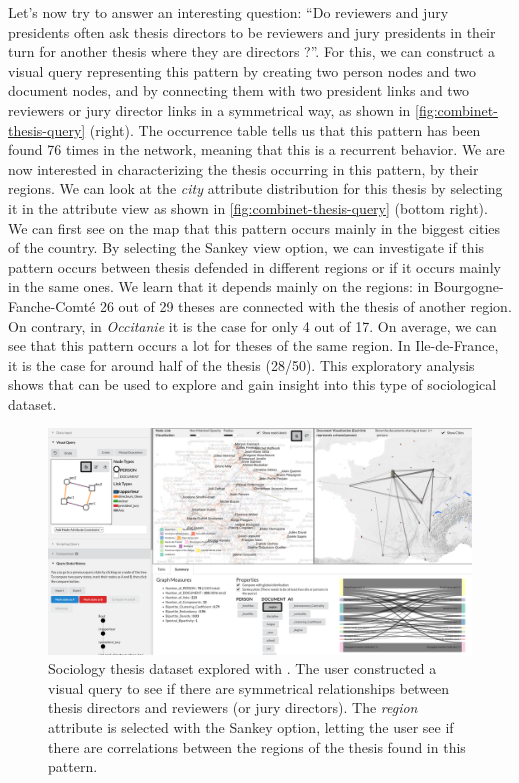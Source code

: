 Let's now try to answer an interesting question: ``Do reviewers and jury presidents often ask thesis directors to be reviewers and jury presidents in their turn for another thesis where they are directors ?''.
For this, we can construct a visual query representing this pattern by creating two person nodes and two document nodes, and by connecting them with two president links and two reviewers or jury director links in a symmetrical way, as shown in \autoref{fig:combinet-thesis-query} (right).
The occurrence table tells us that this pattern has been found 76 times in the network, meaning that this is a recurrent behavior.
We are now interested in characterizing the thesis occurring in this pattern, by their regions.
We can look at the \textit{city} attribute distribution for this thesis by selecting it in the attribute view as shown in \autoref{fig:combinet-thesis-query} (bottom right).
We can first see on the map that this pattern occurs mainly in the biggest cities of the country.
By selecting the Sankey view option, we can investigate if this pattern occurs between thesis defended in different regions or if it occurs mainly in the same ones.
We learn that it depends mainly on the regions: in Bourgogne-Fanche-Comté 26 out of 29 theses are connected with the thesis of another region.
On contrary, in \textit{Occitanie} it is the case for only 4 out of 17.
On average, we can see that this pattern occurs a lot for theses of the same region.
In Ile-de-France, it is the case for around half of the thesis (28/50).
This exploratory analysis shows that \name can be used to explore and gain insight into this type of sociological dataset.

\begin{figure}[!ht]
    \centering
    \includegraphics[width=1\textwidth]{static/figures/ComBiNet/Thesis-query01-and-results}
    \caption{Sociology thesis dataset explored with \name. The user constructed a visual query to see if there are symmetrical relationships between thesis directors and reviewers (or jury directors). The \textit{region} attribute is selected with the Sankey option, letting the user see if there are correlations between the regions of the thesis found in this pattern.  }\label{fig:combinet-thesis-query}
\end{figure}

